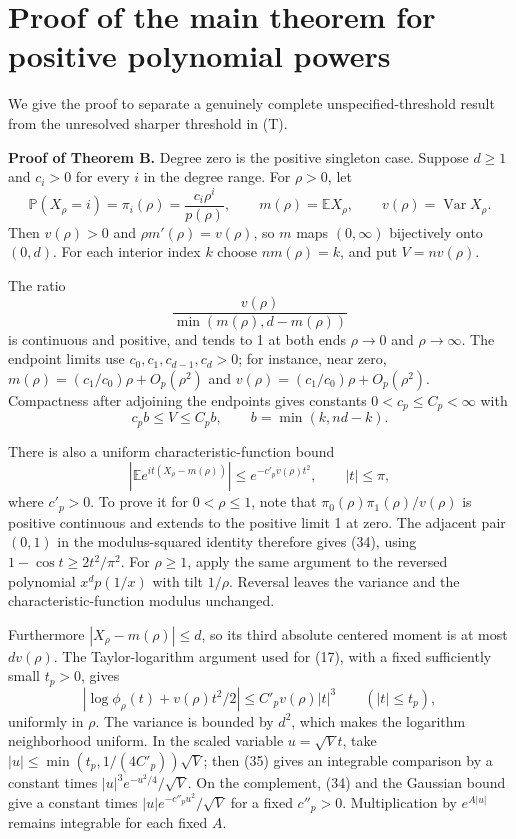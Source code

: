 \documentclass[11pt,a4paper]{article}
\begin{document}
\section{Proof of the main theorem for positive polynomial powers}\label{proof-of-the-general-positive-polynomial-consequence}


We give the proof to separate a genuinely complete unspecified-threshold
result from the unresolved sharper threshold in (T).

\textbf{Proof of Theorem B.} Degree zero is the positive singleton case.
Suppose \(d\geq1\) and \(c_i>0\) for every \(i\) in the degree range.
For \(\rho>0\), let \[
 \mathbb P(X_\rho=i)=\pi_i(\rho)
 =\frac{c_i\rho^i}{p(\rho)},\qquad
 m(\rho)=\mathbb E X_\rho,\qquad v(\rho)=\operatorname{Var}X_\rho.
\] Then \(v(\rho)>0\) and \(\rho m'(\rho)=v(\rho)\), so \(m\) maps
\((0,\infty)\) bijectively onto \((0,d)\). For each interior index \(k\)
choose \(nm(\rho)=k\), and put \(V=nv(\rho)\).

The ratio \[
 \frac{v(\rho)}{\min(m(\rho),d-m(\rho))}
\] is continuous and positive, and tends to 1 at both ends \(\rho\to0\)
and \(\rho\to\infty\). The endpoint limits use
\(c_0,c_1,c_{d-1},c_d>0\); for instance, near zero,
\(m(\rho)=(c_1/c_0)\rho+O_p(\rho^2)\) and
\(v(\rho)=(c_1/c_0)\rho+O_p(\rho^2)\). Compactness after adjoining the
endpoints gives constants \(0<c_p\leq C_p<\infty\) with \[
 c_p b\leq V\leq C_p b,
 \qquad b=\min(k,nd-k). \tag{33}
\]

There is also a uniform characteristic-function bound \[
 |\mathbb E e^{it(X_\rho-m(\rho))}|
 \leq e^{-c'_pv(\rho)t^2},\qquad |t|\leq\pi, \tag{34}
\] where \(c'_p>0\). To prove it for \(0<\rho\leq1\), note that
\(\pi_0(\rho)\pi_1(\rho)/v(\rho)\) is positive continuous and extends to
the positive limit 1 at zero. The adjacent pair \((0,1)\) in the
modulus-squared identity therefore gives (34), using
\(1-\cos t\geq2t^2/\pi^2\). For \(\rho\geq1\), apply the same argument
to the reversed polynomial \(x^dp(1/x)\) with tilt \(1/\rho\). Reversal
leaves the variance and the characteristic-function modulus unchanged.

Furthermore \(|X_\rho-m(\rho)|\leq d\), so its third absolute centered
moment is at most \(d v(\rho)\). The Taylor-logarithm argument used for
(17), with a fixed sufficiently small \(t_p>0\), gives \[
 \left|\log\phi_\rho(t)+v(\rho)t^2/2\right|
 \leq C'_pv(\rho)|t|^3\qquad(|t|\leq t_p), \tag{35}
\] uniformly in \(\rho\). The variance is bounded by \(d^2\), which
makes the logarithm neighborhood uniform. In the scaled variable
\(u=\sqrt Vt\), take \(|u|\leq\min(t_p,1/(4C'_p))\sqrt V\); then (35)
gives an integrable comparison by a constant times
\(|u|^3e^{-u^2/4}/\sqrt V\). On the complement, (34) and the Gaussian
bound give a constant times \(|u|e^{-c''_pu^2}/\sqrt V\) for a fixed
\(c''_p>0\). Multiplication by \(e^{A|u|}\) remains integrable for each
fixed \(A\).
\end{document}
